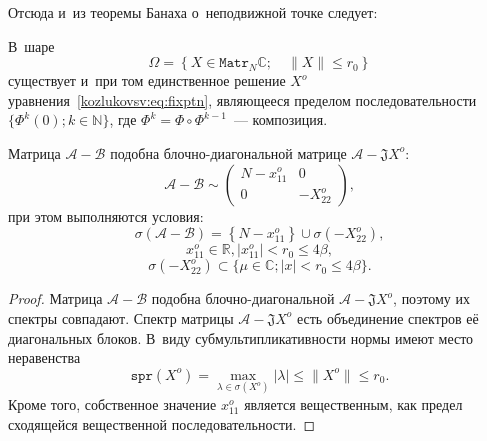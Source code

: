 Отсюда и~из теоремы Банаха о~неподвижной точке следует:
\begin{lem}
В~шаре \[ \Omega = \left\{ X\in\mathtt{Matr}_N\mathbb{C}; \quad \|X\| \leq r_0 \right\} \]
    существует и~при том единственное решение \( X^o \) уравнения~\eqref{kozlukovsv:eq:fixptn},
    являющееся пределом последовательности \( \{ \Phi^k(0); k\in\mathbb{N} \} \),
    где \( \Phi^k = \Phi\circ\Phi^{k-1} \)~--- композиция.
\end{lem}

\begin{crl}
Матрица \( \mathcal{A} - \mathcal{B} \) подобна блочно-диагональной матрице \( \mathcal{A} - \mathfrak{J} X^o \):
\[ \mathcal{A} - \mathcal{B} \sim
\begin{pmatrix}
N - x_{11}^o & 0 \\
0 & -X_{22}^o
\end{pmatrix}, \]
при этом выполняются условия:
\[ \sigma\left(\mathcal{A} - \mathcal{B}\right) = \left\{N-x_{11}^o\right\}\cup \sigma\left(-X_{22}^o\right), \]
    \[ x_{11}^o\in\mathbb{R}, \lvert x_{11}^o \rvert < r_0 \leq 4\beta, \]
\[ \sigma\left(-X_{22}^o\right) \subset \{ \mu\in\mathbb{C}; \lvert x \rvert < r_0 \leq 4\beta \}. \]
\end{crl}
\begin{proof}
    Матрица \( \mathcal{A} - \mathcal{B} \) подобна блочно-диагональной \( \mathcal{A} - \mathfrak{J} X^o \),
    поэтому их спектры совпадают.
    Спектр матрицы \( \mathcal{A} - \mathfrak{J} X^o \) есть объединение спектров е\"е диагональных блоков.
    В~виду субмультипликативности нормы имеют место неравенства
    \[ \mathtt{spr}(X^o) = \max_{\lambda\in\sigma(X^o)}\lvert\lambda\rvert \leq \|X^o\| \leq r_0. \]
    Кроме того, собственное значение \( x_{11}^o \) является вещественным, как предел сходящейся вещественной последовательности.
\end{proof}
